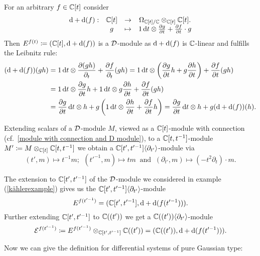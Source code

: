 \begin{ex}\label{kählerexample} For an arbitrary $f \in \mathbb{C}[t]$ consider
\[
\begin{matrix}
\mathop{}\!\mathrm{d}{} + \mathop{}\!\mathrm{d}(f):&  \mathbb{C}[t] &\to &\Omega_{\mathbb{C}[t]/\mathbb{C}} \otimes_{\mathbb{C}[t]} \mathbb{C}[t]. \\
& g & \mapsto & 1 \mathop{}\!\mathrm{d}{t} \otimes \frac{\partial g}{\partial t} + \frac{\partial f}{\partial t} \cdot g
\end{matrix}
\]
Then $E^{f(t)} \coloneqq ( \mathbb{C}[t], \mathop{}\!\mathrm{d} + \mathop{}\!\mathrm{d}(f))$ is a $\mathcal{D}$-module as $\mathop{}\!\mathrm{d} + \mathop{}\!\mathrm{d}(f)$ is $\mathbb{C}$-linear and fulfills the Leibnitz rule:
\begin{align*}
(\diff{} + \diff(f))(gh) & = 1 \diff{t} \otimes \frac{\partial (gh)}{\partial_t} + \frac{\partial f}{\partial_t}(gh) = 1 \diff{t} \otimes \left( \frac{\partial g}{\partial t}h + g \frac{\partial h}{\partial t}\right) + \frac{\partial f}{\partial t}(gh) \\ 
& = 1 \diff{t} \otimes \frac{\partial g}{\partial t}h + 1 \diff{t} \otimes  g \frac{\partial h}{\partial t} + \frac{\partial f}{\partial t}(gh) \\ &  = \frac{\partial g}{\partial t} \diff{t} \otimes h + g\left(1 \diff{t} \otimes  \frac{\partial h}{\partial t} + \frac{\partial f}{\partial t}h\right)  
 = \frac{\partial g}{\partial t} \diff{t} \otimes h + g (\diff{}+\diff(f))(h).
\end{align*}
\end{ex}


Extending scalars of a $\mathcal{D}$-module $M$, viewed as a $\mathbb{C}[t]$-module with connection (cf.\ \ref{module with connection and D module}), to a $\mathbb{C}[t,t^{-1}]$-module $M'\coloneqq M \otimes_{\mathbb{C}[t]} \mathbb{C}[t,t^{-1}]$ we obtain a $\mathbb{C}[t',t'^{-1}]\langle \partial_{t'} \rangle$-module via 
\[
    (t',m) \mapsto t^{-1}m; ~~ 
    (t'^{-1},m) \mapsto tm ~\text{ and }~
    (\partial_{t'},m) \mapsto (-t^2\partial_t)\cdot m.
\]

\begin{ex}\label{GaussiantypeBsp}
The extension to $\mathbb{C}[t',t'^{-1}]$ of the $\mathcal{D}$-module we considered in example (\ref{kählerexample}) gives us the $\mathbb{C}[t',t'^{-1}]\langle \partial_{t'} \rangle$-module 
\[
E^{f(t'^{-1})} = (\mathbb{C}[t',t'^{-1}], \mathop{}\!\mathrm{d}{}+\mathop{}\!\mathrm{d}(f(t'^{-1}))).
\]
Further extending $\mathbb{C}[t',t'^{-1}]$ to $\mathbb{C}((t'))$ we get a $\mathbb{C}((t'))\langle \partial_{t'} \rangle$-module  
\[
\mathcal{E}^{f(t'^{-1})} \coloneqq E^{f(t'^{-1})} \otimes_{\mathbb{C}[t',t'^{-1}]} \mathbb{C}((t')) = (\mathbb{C}((t')), \mathop{}\!\mathrm{d} + \mathop{}\!\mathrm{d}(f(t'^{-1}))).
\]
\end{ex}

Now we can give the definition for differential systems of pure Gaussian type:

